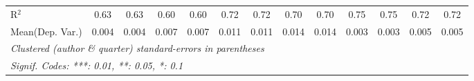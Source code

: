 \begin{tabular}{lcccccccccccc}
   R$^2$                                    & 0.63          & 0.63           & 0.60    & 0.60         & 0.72    & 0.72         & 0.70    & 0.70         & 0.75     & 0.75     & 0.72        & 0.72\\  
Mean(Dep. Var.) & 0.004 & 0.004 & 0.007 & 0.007 & 0.011 & 0.011 & 0.014 & 0.014 & 0.003 & 0.003 & 0.005 & 0.005 \\
   \midrule \midrule
   \multicolumn{13}{l}{\emph{Clustered (author \& quarter) standard-errors in parentheses}}\\
   \multicolumn{13}{l}{\emph{Signif. Codes: ***: 0.01, **: 0.05, *: 0.1}}\\
\end{tabular}
\par\endgroup
